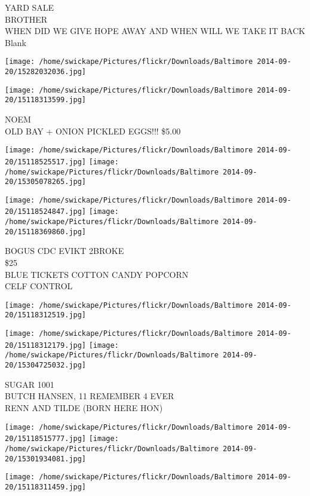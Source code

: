 \documentclass[10pt,letterpaper]{article}
\begin{document}
YARD SALE\\
BROTHER\\
WHEN DID WE GIVE HOPE AWAY AND WHEN WILL WE TAKE IT BACK\\
Blank
\pagebreak

\texttt{[image: /home/swickape/Pictures/flickr/Downloads/Baltimore 2014-09-20/15282032036.jpg]}

\vspace{0.25in}
\texttt{[image: /home/swickape/Pictures/flickr/Downloads/Baltimore 2014-09-20/15118313599.jpg]}

NOEM\\
OLD BAY + ONION PICKLED EGGS!!! \$5.00
\pagebreak

\texttt{[image: /home/swickape/Pictures/flickr/Downloads/Baltimore 2014-09-20/15118525517.jpg]}
\texttt{[image: /home/swickape/Pictures/flickr/Downloads/Baltimore 2014-09-20/15305078265.jpg]}

\texttt{[image: /home/swickape/Pictures/flickr/Downloads/Baltimore 2014-09-20/15118524847.jpg]}
\texttt{[image: /home/swickape/Pictures/flickr/Downloads/Baltimore 2014-09-20/15118369860.jpg]}

BOGUS CDC EVIKT 2BROKE\\
\$25\\
BLUE TICKETS COTTON CANDY POPCORN\\
CELF CONTROL
\pagebreak

\texttt{[image: /home/swickape/Pictures/flickr/Downloads/Baltimore 2014-09-20/15118312519.jpg]}

\vspace{0.25in}
\texttt{[image: /home/swickape/Pictures/flickr/Downloads/Baltimore 2014-09-20/15118312179.jpg]}
\texttt{[image: /home/swickape/Pictures/flickr/Downloads/Baltimore 2014-09-20/15304725032.jpg]}

SUGAR 1001\\
BUTCH HANSEN, 11 REMEMBER 4 EVER\\
RENN AND TILDE (BORN HERE HON)
\pagebreak

\texttt{[image: /home/swickape/Pictures/flickr/Downloads/Baltimore 2014-09-20/15118515777.jpg]}
\texttt{[image: /home/swickape/Pictures/flickr/Downloads/Baltimore 2014-09-20/15301934081.jpg]}

\vspace{0.25in}
\texttt{[image: /home/swickape/Pictures/flickr/Downloads/Baltimore 2014-09-20/15118311459.jpg]}
\end{document}
